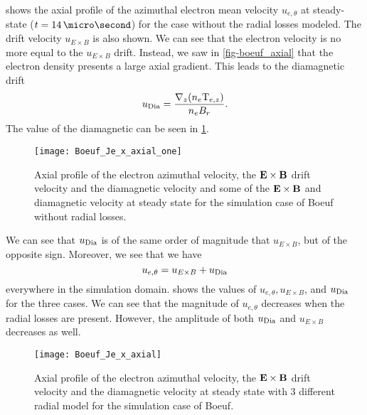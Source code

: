  shows the axial profile of the azimuthal electron mean velocity $u_{e, \theta}$ at steady-state ($t = 14\,\micro\second$) for the case without the radial losses modeled.
The drift velocity $u_{E \times B}$ is also shown.
We can see that the electron velocity is no more equal to the $u_{E \times B}$ drift.
Instead, we saw in \cref{fig-boeuf_axial} that the electron density presents a large axial gradient.
This leads to the diamagnetic drift
$$u_{\rm Dia}=\frac{\nabla_z (n_e {\rm T}_{e,z})}{n_e B_r}.$$
The value of the diamagnetic can be seen in \cref{fig-Jetheta_sum}.


\begin{figure}[hbtp]
  \centering
  \texttt{[image: Boeuf\_Je\_x\_axial\_one]}
  \caption{Axial profile of the electron azimuthal velocity, the ${\mathbf E} \times {\mathbf B}$ drift velocity and the diamagnetic velocity and some of the ${\mathbf E} \times {\mathbf B}$ and diamagnetic velocity at steady state for the simulation case of Boeuf without radial losses.}
  \label{fig-Jetheta_sum}
\end{figure}

We can see that $u_{\rm Dia}$ is of the same order of magnitude that $u_{E \times B}$, but of the opposite sign.
Moreover, we see that we have 
$$ u_{e, \theta} =   u_{E \times B} + u_{\rm Dia}$$
everywhere in the simulation domain.
 shows the values of $ u_{e, \theta},   u_{E \times B}$, and $u_{\rm Dia}$ for the three cases.
We can see that the magnitude of $u_{e, \theta} $ decreases when the radial losses are present.
However, the amplitude of both $u_{\rm Dia}$ and $u_{E \times B}$ decreases as well.

 
\begin{figure}[hbtp]
  \centering
  \texttt{[image: Boeuf\_Je\_x\_axial]}
  \caption{Axial profile of the electron azimuthal velocity, the ${\mathbf E} \times {\mathbf B}$ drift velocity and the diamagnetic velocity at steady state with 3 different radial model for the simulation case of Boeuf.}
  \label{fig-Jetheta}
\end{figure}

